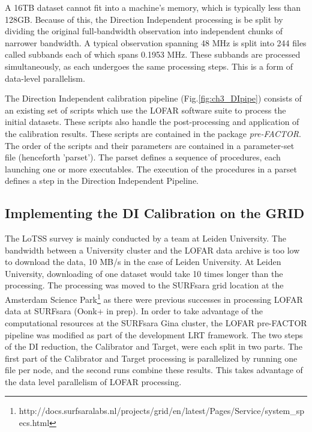 A 16TB dataset cannot fit into a machine's memory, which is typically less than 128GB. Because of this,  the Direction Independent processing is be split by dividing the original full-bandwidth observation into independent chunks of narrower bandwidth. A typical observation spanning 48 MHz is split into 244 files called subbands each of which spans 0.1953 MHz.  These subbands are processed simultaneously, as each undergoes the same processing steps. This is a form of data-level parallelism. 


The Direction Independent calibration pipeline (Fig.\ref{fig:ch3_DIpipe}) consists of an existing set of scripts which use the LOFAR software suite\cite{lofarcookbook} to process the initial datasets. These scripts also handle the post-processing and application of the calibration results\cite{van2016lofar}. These scripts are contained in the package \emph{pre-FACTOR}\cite{prefactor}. The order of the scripts and their parameters are contained in a parameter-set file (henceforth 'parset'). The parset defines a sequence of procedures, each launching one or more executables. The execution of the procedures in a parset defines a step in the Direction Independent Pipeline. 


\subsection{Implementing the DI Calibration on the GRID}\label{sec:ch3_impl}

The LoTSS survey is mainly conducted by a team at Leiden University. The bandwidth between a University cluster and the LOFAR data archive is too low to download the data, 10 MB/s in the case of Leiden University. At Leiden University, downloading of one dataset would take 10 times longer than the processing. The processing  was moved to the SURFsara grid location at the Amsterdam Science Park\footnote{http://docs.surfsaralabs.nl/projects/grid/en/latest/Pages/Service/system\_specs.html} as there were previous successes in processing LOFAR data at SURFsara (Oonk+ in prep).  In order to take advantage of the computational resources at the SURFsara Gina cluster\cite{gina_specs}, the LOFAR pre-FACTOR pipeline was modified as part of the development LRT framework. The two steps of the DI reduction, the Calibrator and Target, were each split in two parts. The first part of the Calibrator and Target processing is parallelized by running one file per node, and the second runs combine these results. This takes advantage of the data level parallelism of LOFAR processing.

